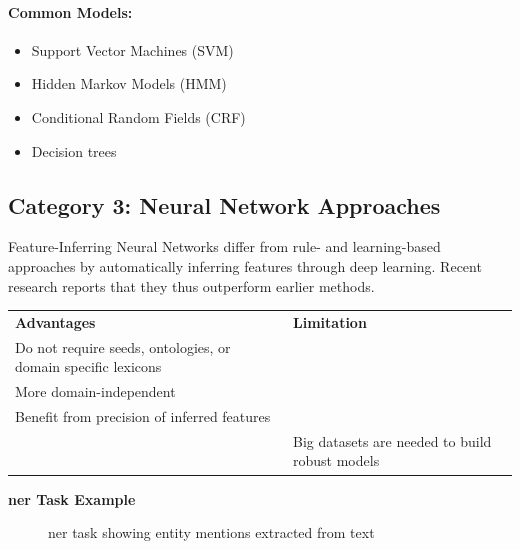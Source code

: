 \paragraph{Common Models:}
\begin{itemize}
    \item Support Vector Machines (SVM)
    \item Hidden Markov Models (HMM)
    \item Conditional Random Fields (CRF)
    \item Decision trees
\end{itemize}

\subsection*{Category 3: Neural Network Approaches}
Feature-Inferring Neural Networks differ from rule- and learning-based approaches by automatically inferring
features through deep learning. Recent research reports that they thus outperform
earlier methods.

\begin{mytable}
    \begin{tabular}{p{} p{}}
        \textbf{Advantages}                                           & \textbf{Limitation}                            \\

        Do not require seeds, ontologies, or domain specific lexicons &                                                \\

        More domain-independent                                       &                                                \\

        Benefit from precision of inferred features                   &                                                \\

        & Big datasets are needed to build robust models \\
    \end{tabular}
    \caption{Advantages and limitation of embedding-based approaches.}
    \label{tab:embedding_adv_limitation}
\end{mytable}

\begin{bsp}
    \textbf{\gls{ner} Task Example}
    \begin{figure}[H]
        \caption{\gls{ner} task showing entity mentions extracted from text}
    \end{figure}
\end{bsp}

